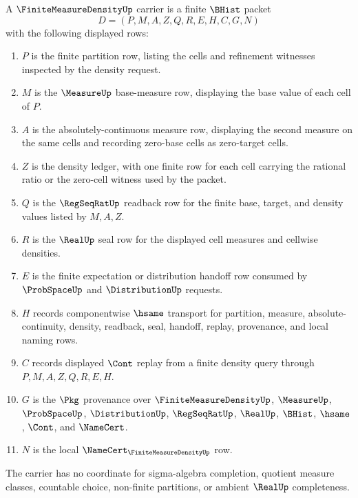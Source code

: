 \begin{definition}
\label{def:finite-measure-density-carrier}
A $\FiniteMeasureDensityUp$ carrier is a finite $\BHist$ packet
$$
D=(P,M,A,Z,Q,R,E,H,C,G,N)
$$
with the following displayed rows:
\begin{enumerate}
\item $P$ is the finite partition row, listing the cells and refinement witnesses inspected by the density request.
\item $M$ is the $\MeasureUp$ base-measure row, displaying the base value of each cell of $P$.
\item $A$ is the absolutely-continuous measure row, displaying the second measure on the same cells and recording zero-base cells as zero-target cells.
\item $Z$ is the density ledger, with one finite row for each cell carrying the rational ratio or the zero-cell witness used by the packet.
\item $Q$ is the $\RegSeqRatUp$ readback row for the finite base, target, and density values listed by $M,A,Z$.
\item $R$ is the $\RealUp$ seal row for the displayed cell measures and cellwise densities.
\item $E$ is the finite expectation or distribution handoff row consumed by $\ProbSpaceUp$ and $\DistributionUp$ requests.
\item $H$ records componentwise $\hsame$ transport for partition, measure, absolute-continuity, density, readback, seal, handoff, replay, provenance, and local naming rows.
\item $C$ records displayed $\Cont$ replay from a finite density query through $P,M,A,Z,Q,R,E,H$.
\item $G$ is the $\Pkg$ provenance over $\FiniteMeasureDensityUp$, $\MeasureUp$, $\ProbSpaceUp$, $\DistributionUp$, $\RegSeqRatUp$, $\RealUp$, $\BHist$, $\hsame$, $\Cont$, and $\NameCert$.
\item $N$ is the local $\NameCert_{\FiniteMeasureDensityUp}$ row.
\end{enumerate}
The carrier has no coordinate for sigma-algebra completion, quotient measure classes, countable choice, non-finite partitions, or ambient $\RealUp$ completeness.
\end{definition}

